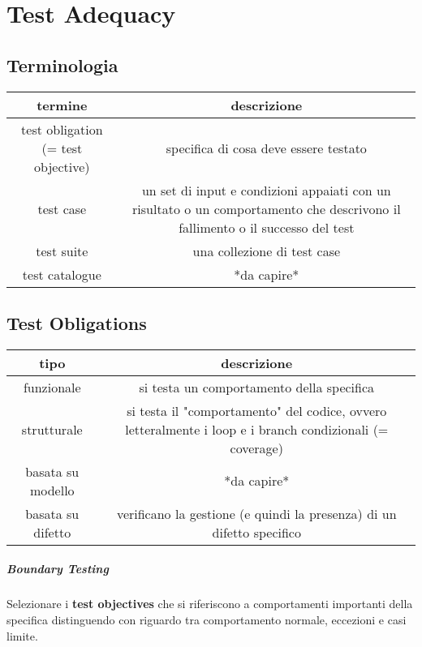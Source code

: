 \chapter{Test Adequacy}

\section{Terminologia}

\begin{center}
	\begin{tabular}{|| c c ||}
		\hline
		termine & descrizione \\
		\hline
		test obligation (= test objective) & specifica di cosa deve essere testato \\
		test case & un set di input e condizioni appaiati con un risultato o un comportamento che descrivono il fallimento o il successo del test \\
		test suite & una collezione di test case \\
		test catalogue & *da capire* \\
		\hline
	\end{tabular}
\end{center}

\section{Test Obligations}

\begin{center}
	\begin{tabular}{|| c c ||}
		\hline
		tipo & descrizione \\
		\hline
			funzionale & si testa un comportamento della specifica \\
			strutturale & si testa il "comportamento" del codice, ovvero letteralmente i loop e i branch condizionali (= coverage) \\
			basata su modello & *da capire* \\
			basata su difetto & verificano la gestione (e quindi la presenza) di un difetto specifico \\
		\hline
	\end{tabular}
\end{center}

\paragraph{Boundary Testing}

Selezionare i \textbf{test objectives} che si riferiscono a comportamenti importanti della specifica distinguendo con riguardo tra comportamento normale, eccezioni e casi limite.

